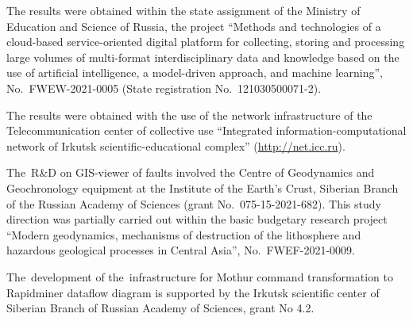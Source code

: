 \documentclass[
]{ceurart}
\begin{document}
\begin{acknowledgments}

The results were obtained within the state assignment of the Ministry of Education and Science of Russia, the project ``Methods and technologies of a cloud-based service-oriented digital platform for collecting, storing and processing large volumes of multi-format interdisciplinary data and knowledge based on the use of artificial intelligence, a model-driven approach, and machine learning'', No.~FWEW-2021-0005 (State registration No.~121030500071-2).

The results were obtained with the use of the network infrastructure of the Telecommunication center of collective use ``Integrated information-computational network of Irkutsk scientific-educational complex'' (\url{http://net.icc.ru}).

The~R\&D on GIS-viewer of faults involved the Centre of Geodynamics and Geochronology equipment at the Institute of the Earth's Crust, Siberian Branch of the Russian Academy of Sciences (grant No.~075-15-2021-682).   This study direction was partially carried out within the basic budgetary research project ``Modern geodynamics, mechanisms of destruction of the lithosphere and hazardous geological processes in Central Asia'', No.~FWEF-2021-0009.

The~development of the~infrastructure for Mothur command transformation to Rapidminer dataflow diagram is supported by the Irkutsk scientific center of Siberian Branch of Russian Academy of Sciences, grant No 4.2.

\end{acknowledgments}
% 
\end{document}

